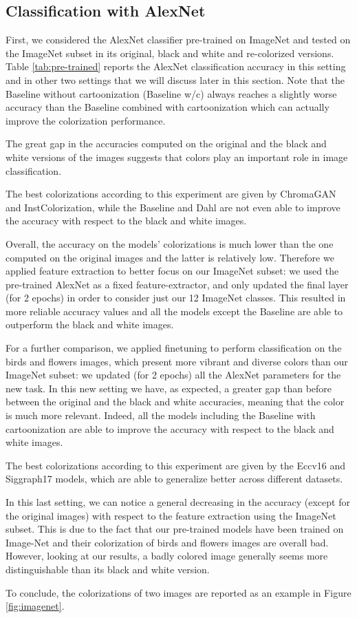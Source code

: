 \subsection{Classification with AlexNet}
First, we considered the AlexNet classifier pre-trained on ImageNet and tested on the ImageNet subset in its original, black and white and re-colorized versions. Table \ref{tab:pre-trained} reports the AlexNet classification accuracy in this setting and in other two settings that we will discuss later in this section. Note that the Baseline without cartoonization (Baseline w/c) always reaches a slightly worse accuracy than the Baseline combined with cartoonization which can actually improve the colorization performance.

The great gap in the accuracies computed on the original and the black and white versions of the images suggests that colors play an important role in image classification.

The best colorizations according to this experiment are given by ChromaGAN and InstColorization, while the Baseline and Dahl are not even able to improve the accuracy with respect to the black and white images.

Overall, the accuracy on the models' colorizations is much lower than the one computed on the original images and the latter is relatively low. Therefore we applied feature extraction to better focus on our ImageNet subset: we used the pre-trained AlexNet as a fixed feature-extractor, and only updated the final layer (for 2 epochs) in order to consider just our 12 ImageNet classes. This resulted in more reliable accuracy values and all the models except the Baseline are able to outperform the black and white images.

For a further comparison, we applied finetuning to perform classification on the birds and flowers images, which present
more vibrant and diverse colors than our ImageNet subset: we updated (for 2 epochs) all the AlexNet parameters for the new task. In this new setting we have, as expected, a greater gap than before between the original and the black and white accuracies, meaning that the color is much more relevant. Indeed, all the models including the Baseline with cartoonization are able to improve the accuracy with respect to the black and white images.

The best colorizations according to this experiment are given by the Eccv16 and Siggraph17 models, which are able to generalize better across different datasets.

In this last setting, we can notice a general decreasing in the accuracy (except for the original images) with
respect to the feature extraction using the ImageNet subset. This is due to the fact that our pre-trained models
have been trained on Image-Net and their colorization of birds and flowers images are overall bad. However, looking at our results, a badly colored image generally seems more distinguishable than its black and white version.

To conclude, the colorizations of two images are reported as an example in Figure \ref{fig:imagenet}.

